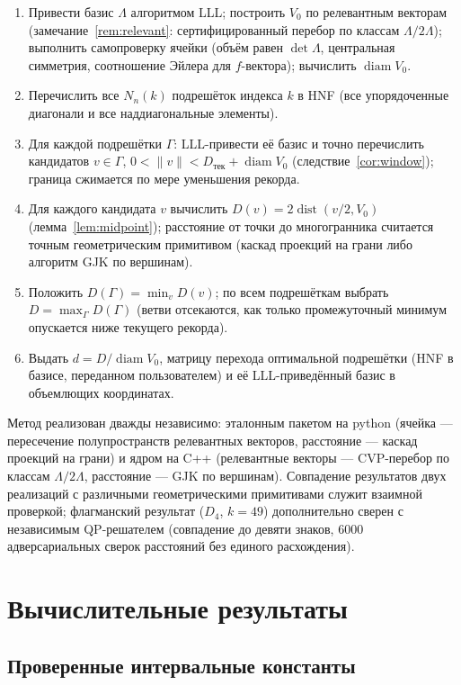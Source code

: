 \documentclass[12pt]{article}
\theoremstyle{plain}
\theoremstyle{definition}
\theoremstyle{remark}
\DeclareMathOperator{\diam}{diam}
\DeclareMathOperator{\dist}{dist}
\begin{document}
\begin{enumerate}
\item Привести базис $\Lambda$ алгоритмом LLL; построить $V_0$ по релевантным
      векторам (замечание~\ref{rem:relevant}: сертифицированный перебор по
      классам $\Lambda/2\Lambda$); выполнить самопроверку ячейки (объём равен
      $\det\Lambda$, центральная симметрия, соотношение Эйлера для
      $f$-вектора); вычислить $\diam V_0$.
\item Перечислить все $N_n(k)$ подрешёток индекса $k$ в HNF (все упорядоченные
      диагонали и все наддиагональные элементы).
\item Для каждой подрешётки $\Gamma$: LLL-привести её базис и точно
      перечислить кандидатов $v\in\Gamma$, $0<\|v\|<D_{\text{тек}}+\diam V_0$
      (следствие~\ref{cor:window}); граница сжимается по мере уменьшения
      рекорда.
\item Для каждого кандидата $v$ вычислить $D(v)=2\dist(v/2,V_0)$
      (лемма~\ref{lem:midpoint}); расстояние от точки до многогранника
      считается точным геометрическим примитивом (каскад проекций на грани
      либо алгоритм GJK по вершинам).
\item Положить $D(\Gamma)=\min_v D(v)$; по всем подрешёткам выбрать
      $D=\max_\Gamma D(\Gamma)$ (ветви отсекаются, как только промежуточный
      минимум опускается ниже текущего рекорда).
\item Выдать $d=D/\diam V_0$, матрицу перехода оптимальной подрешётки (HNF в
      базисе, переданном пользователем) и её LLL-приведённый базис в
      объемлющих координатах.
\end{enumerate}

Метод реализован дважды независимо: эталонным пакетом на python (ячейка ---
пересечение полупространств релевантных векторов, расстояние --- каскад
проекций на грани) и ядром на C++ (релевантные векторы ---
CVP-перебор по классам $\Lambda/2\Lambda$, расстояние --- GJK по вершинам).
Совпадение результатов двух реализаций с различными геометрическими
примитивами служит взаимной проверкой; флагманский результат ($D_4$, $k=49$)
дополнительно сверен с независимым QP-решателем (совпадение до девяти знаков,
$6000$ адверсариальных сверок расстояний без единого расхождения).

\section{Вычислительные результаты}

\subsection{Проверенные интервальные константы}
\end{document}

